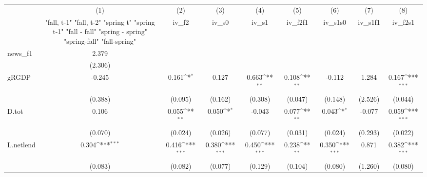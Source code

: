 {
\def\sym#1{\ifmmode^{#1}\else\(^{#1}\)\fi}
\begin{tabular}{l*{8}{c}}
\toprule
            &\multicolumn{1}{c}{(1)}&\multicolumn{1}{c}{(2)}&\multicolumn{1}{c}{(3)}&\multicolumn{1}{c}{(4)}&\multicolumn{1}{c}{(5)}&\multicolumn{1}{c}{(6)}&\multicolumn{1}{c}{(7)}&\multicolumn{1}{c}{(8)}\\
            &\multicolumn{1}{c}{  "fall, t-1" "fall, t-2" "spring t" "spring t-1"  "fall - fall" "spring - spring" "spring-fall" "fall-spring" }&\multicolumn{1}{c}{iv\_f2}&\multicolumn{1}{c}{iv\_s0}&\multicolumn{1}{c}{iv\_s1}&\multicolumn{1}{c}{iv\_f2f1}&\multicolumn{1}{c}{iv\_s1s0}&\multicolumn{1}{c}{iv\_s1f1}&\multicolumn{1}{c}{iv\_f2s1}\\
\midrule
news\_f1     &       2.379         &                     &                     &                     &                     &                     &                     &                     \\
            &     (2.306)         &                     &                     &                     &                     &                     &                     &                     \\
\addlinespace
gRGDP       &      -0.245         &       0.161\sym{*}  &       0.127         &       0.663\sym{**} &       0.108\sym{**} &      -0.112         &       1.284         &       0.167\sym{***}\\
            &     (0.388)         &     (0.095)         &     (0.162)         &     (0.308)         &     (0.047)         &     (0.148)         &     (2.526)         &     (0.044)         \\
\addlinespace
D.tot       &       0.106         &       0.055\sym{**} &       0.050\sym{*}  &      -0.043         &       0.077\sym{**} &       0.043\sym{*}  &      -0.077         &       0.059\sym{***}\\
            &     (0.070)         &     (0.024)         &     (0.026)         &     (0.077)         &     (0.031)         &     (0.024)         &     (0.293)         &     (0.022)         \\
\addlinespace
L.netlend   &       0.304\sym{***}&       0.416\sym{***}&       0.380\sym{***}&       0.450\sym{***}&       0.238\sym{**} &       0.350\sym{***}&       0.871         &       0.382\sym{***}\\
            &     (0.083)         &     (0.082)         &     (0.077)         &     (0.129)         &     (0.104)         &     (0.080)         &     (1.260)         &     (0.080)         \\

\end{tabular}}
